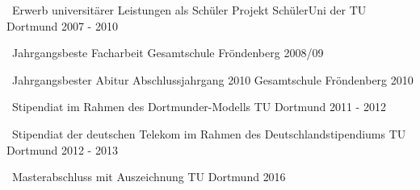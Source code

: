 
\begin{cvhonors}
    \cvhonor
        {~Erwerb universitärer Leistungen als Schüler} %
        {Projekt SchülerUni der TU Dortmund} %
        {} %
        {2007 - 2010} %

    \cvhonor
        {~Jahrgangsbeste Facharbeit} %
        {Gesamtschule Fröndenberg} %
        {} %
        {2008/09} %

    \cvhonor
        {~Jahrgangsbester Abitur Abschlussjahrgang 2010} %
        {Gesamtschule Fröndenberg} %
        {} %
        {2010} %

    \cvhonor
        {~Stipendiat im Rahmen des Dortmunder-Modells} %
        {TU Dortmund} %
        {} %
        {2011 - 2012} %

    \cvhonor
        {~Stipendiat der deutschen Telekom im Rahmen des Deutschlandstipendiums} %
        {TU Dortmund} %
        {} %
        {2012 - 2013} %

    \cvhonor
        {~Masterabschluss mit Auszeichnung} %
        {TU Dortmund} %
        {} %
        {2016} %

\end{cvhonors}
